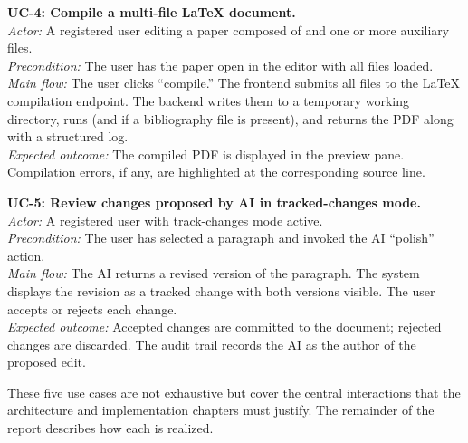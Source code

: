 \textbf{UC-4: Compile a multi-file LaTeX document.}\\
\textit{Actor:} A registered user editing a paper composed of  and one or more auxiliary files.\\
\textit{Precondition:} The user has the paper open in the editor with all files loaded.\\
\textit{Main flow:} The user clicks ``compile.'' The frontend submits all files to the LaTeX compilation endpoint. The backend writes them to a temporary working directory, runs  (and  if a bibliography file is present), and returns the PDF along with a structured log.\\
\textit{Expected outcome:} The compiled PDF is displayed in the preview pane. Compilation errors, if any, are highlighted at the corresponding source line.

\textbf{UC-5: Review changes proposed by AI in tracked-changes mode.}\\
\textit{Actor:} A registered user with track-changes mode active.\\
\textit{Precondition:} The user has selected a paragraph and invoked the AI ``polish'' action.\\
\textit{Main flow:} The AI returns a revised version of the paragraph. The system displays the revision as a tracked change with both versions visible. The user accepts or rejects each change.\\
\textit{Expected outcome:} Accepted changes are committed to the document; rejected changes are discarded. The audit trail records the AI as the author of the proposed edit.

These five use cases are not exhaustive but cover the central interactions that the architecture and implementation chapters must justify. The remainder of the report describes how each is realized.
